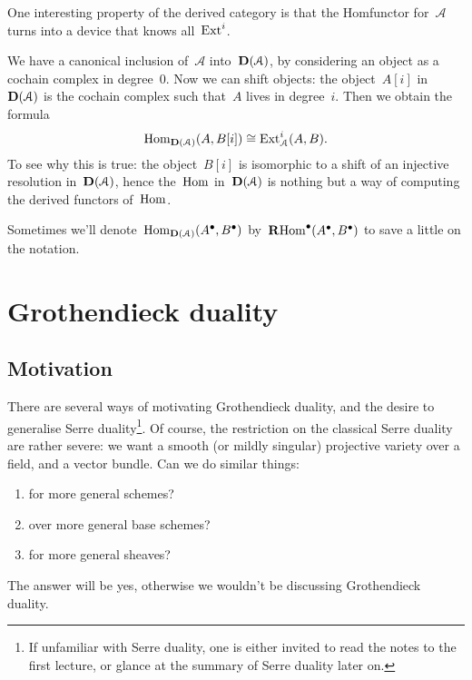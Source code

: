 \documentclass[10pt,a4paper]{article}
\begin{document}
One interesting property of the derived category is that the Hom\dash functor for~$\mathcal{A}$ turns into a device that knows all~$\operatorname{Ext}^i$.
\begin{example}
  We have a canonical inclusion of~$\mathcal{A}$ into~$\mathbf{D}(\mathcal{A})$, by considering an object as a cochain complex in degree~$0$. Now we can shift objects: the object~$A[i]$ in~$\mathbf{D}(\mathcal{A})$ is the cochain complex such that~$A$ lives in degree~$i$. Then we obtain the formula
  \begin{equation}
    \label{equation:Hom-Ext}
    \operatorname{Hom}_{\mathbf{D}(\mathcal{A})}(A,B[i])\cong\operatorname{Ext}_{\mathcal{A}}^i(A,B).
  \end{equation}
  To see why this is true: the object~$B[i]$ is isomorphic to a shift of an injective resolution in~$\mathbf{D}(\mathcal{A})$, hence the~$\operatorname{Hom}$ in~$\mathbf{D}(\mathcal{A})$ is nothing but a way of computing the derived functors of~$\operatorname{Hom}$.

  Sometimes we'll denote~$\operatorname{Hom}_{\mathbf{D}(\mathcal{A})}(A^\bullet,B^\bullet)$ by~$\operatorname{\mathbf{R}Hom}^\bullet(A^\bullet,B^\bullet)$ to save a little on the notation.
\end{example}


\section{Grothendieck duality}
\label{section:grothendieck-duality}
\subsection{Motivation}
\label{subsection:motivation}
There are several ways of motivating Grothendieck duality, and the desire to generalise Serre duality\footnote{If unfamiliar with Serre duality, one is either invited to read the notes to the first lecture, or glance at the summary of Serre duality later on.}. Of course, the restriction on the classical Serre duality are rather severe: we want a smooth (or mildly singular) projective variety over a field, and a vector bundle. Can we do similar things:
\begin{enumerate}
  \item for more general schemes? 
  \item over more general base schemes?
  \item for more general sheaves?
\end{enumerate}
The answer will be yes, otherwise we wouldn't be discussing Grothendieck duality.
\end{document}
